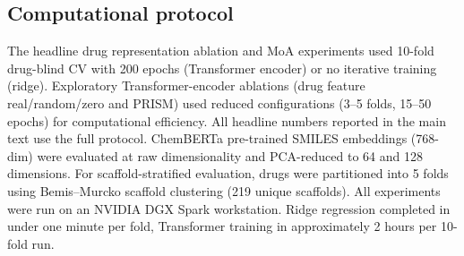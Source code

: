 \subsection*{Computational protocol}

The headline drug representation ablation and MoA experiments used 10-fold drug-blind CV with 200 epochs (Transformer encoder) or no iterative training (ridge). Exploratory Transformer-encoder ablations (drug feature real/random/zero and PRISM) used reduced configurations (3--5 folds, 15--50 epochs) for computational efficiency. All headline numbers reported in the main text use the full protocol. ChemBERTa\cite{chithrananda2020chemberta} pre-trained SMILES embeddings (768-dim) were evaluated at raw dimensionality and PCA-reduced to 64 and 128 dimensions. For scaffold-stratified evaluation, drugs were partitioned into 5 folds using Bemis--Murcko scaffold clustering\cite{bemis1996properties} (219 unique scaffolds). All experiments were run on an NVIDIA DGX Spark workstation. Ridge regression completed in under one minute per fold, Transformer training in approximately 2 hours per 10-fold run.
